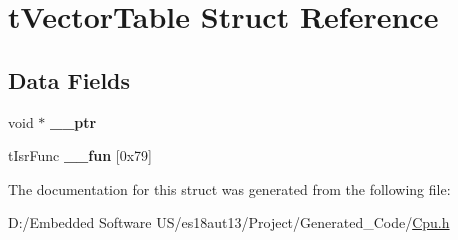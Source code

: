 \hypertarget{structt_vector_table}{}\section{t\+Vector\+Table Struct Reference}
\label{structt_vector_table}
\subsection*{Data Fields}
\begin{DoxyCompactItemize}
\item 
\hypertarget{structt_vector_table_a324d365e9c8c6c033f4edbc906f94844}{}void $\ast$ {\bfseries \+\_\+\+\_\+ptr}\label{structt_vector_table_a324d365e9c8c6c033f4edbc906f94844}

\item 
\hypertarget{structt_vector_table_a6001c7c57c392674cadaf831203e4606}{}t\+Isr\+Func {\bfseries \+\_\+\+\_\+fun} \mbox{[}0x79\mbox{]}\label{structt_vector_table_a6001c7c57c392674cadaf831203e4606}

\end{DoxyCompactItemize}


The documentation for this struct was generated from the following file\+:\begin{DoxyCompactItemize}
\item 
D\+:/\+Embedded Software U\+S/es18aut13/\+Project/\+Generated\+\_\+\+Code/\hyperlink{_cpu_8h}{Cpu.\+h}\end{DoxyCompactItemize}
